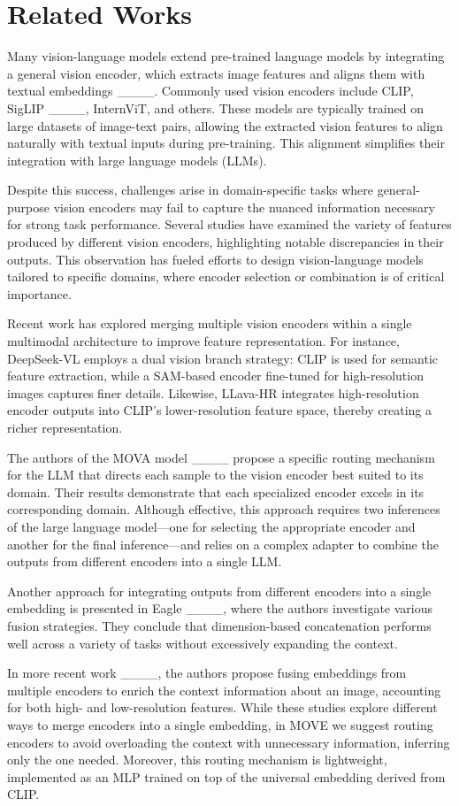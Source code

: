 \section{Related Works}
Many vision-language models extend pre-trained language models by integrating a general vision encoder, which extracts image features and aligns them with textual embeddings ____. Commonly used vision encoders include CLIP, SigLIP ____, InternViT, and others. These models are typically trained on large datasets of image-text pairs, allowing the extracted vision features to align naturally with textual inputs during pre-training. This alignment simplifies their integration with large language models (LLMs).

Despite this success, challenges arise in domain-specific tasks where general-purpose vision encoders may fail to capture the nuanced information necessary for strong task performance. Several studies have examined the variety of features produced by different vision encoders, highlighting notable discrepancies in their outputs. This observation has fueled efforts to design vision-language models tailored to specific domains, where encoder selection or combination is of critical importance.

Recent work has explored merging multiple vision encoders within a single multimodal architecture to improve feature representation. For instance, DeepSeek-VL employs a dual vision branch strategy: CLIP is used for semantic feature extraction, while a SAM-based encoder fine-tuned for high-resolution images captures finer details. Likewise, LLava-HR integrates high-resolution encoder outputs into CLIP’s lower-resolution feature space, thereby creating a richer representation.

The authors of the MOVA model ____ propose a specific routing mechanism for the LLM that directs each sample to the vision encoder best suited to its domain. Their results demonstrate that each specialized encoder excels in its corresponding domain. Although effective, this approach requires two inferences of the large language model—one for selecting the appropriate encoder and another for the final inference—and relies on a complex adapter to combine the outputs from different encoders into a single LLM.

Another approach for integrating outputs from different encoders into a single embedding is presented in Eagle ____, where the authors investigate various fusion strategies. They conclude that dimension-based concatenation performs well across a variety of tasks without excessively expanding the context.

In more recent work ____, the authors propose fusing embeddings from multiple encoders to enrich the context information about an image, accounting for both high- and low-resolution features. While these studies explore different ways to merge encoders into a single embedding, in MOVE we suggest routing encoders to avoid overloading the context with unnecessary information, inferring only the one needed. Moreover, this routing mechanism is lightweight, implemented as an MLP trained on top of the universal embedding derived from CLIP.